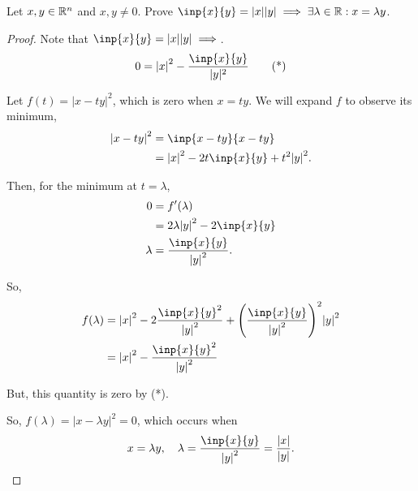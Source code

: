 \documentclass[../hw1.tex]{subfiles}
\begin{document}
\begin{problem}
Let $x,y\in \mathbb{R}^{n}$ and $x,y\neq 0$. Prove $\inp{x}{y}=|x||y|\implies \exists \lambda\in \R : x=\lambda y$.
\end{problem}
\begin{proof}
	Note that $\inp{x }{y } = |x||y| \implies $.
	\begin{equation}
		0 = {|x|}^2-\frac{\inp{x }{y }}{|y|^2} \tag{*}
	\end{equation}

	Let $f(t)={|x-ty|}^2$, which is zero when $x=ty$.
	We will expand $f $ to observe its minimum,
	\begin{align*}
		{|x-ty| }^2 & = \inp{x-ty }{x-ty }                   \\
		            & = {|x|}^2 -2t\inp{x }{y }+t^2 {|y|}^2. \\
	\end{align*}

	Then, for the minimum at $t=\lambda$,
	\begin{align*}
		0       & =f'(\lambda)                      \\
		        & = 2\lambda{|y|}^2 - 2\inp{x }{y } \\
		\lambda & = \frac{\inp{x}{y}}{{|y|}^2}.     \\
	\end{align*}

	So,
	\begin{align*}
		f(\lambda) & = {|x|}^2-2\frac{{\inp{x}{y}}^2}{{|y|}^2}+{\left( \frac{\inp{x}{y}}{{|y|}^2} \right)}^2 {|y|}^2 \\
		           & = {|x|}^2 - \frac{{\inp{x}{y}}^2}{{|y|}^2}                                                      \\
	\end{align*}

	But, this quantity is zero by (*).

	So, $f(\lambda)={|x-\lambda y|}^2=0$, which occurs when \[
		x=\lambda y, \quad \lambda = \frac{\inp{x}{y}}{{|y|}^2} = \frac{|x|}{|y|}.
	\]
\end{proof}
\end{document}

